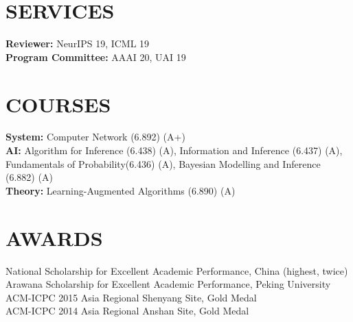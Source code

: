 \documentclass[margin]{res}
\newcommand{\Bullet}[1]{{\raisebox{0.25ex}{\tiny$\bullet$\ }}{#1}\\}
\begin{document}
\begin{resume}

\section{SERVICES}
\textbf{Reviewer:} NeurIPS 19, ICML 19\\
\textbf{Program Committee:} AAAI 20, UAI 19

\section{COURSES}
\textbf{System:} Computer Network (6.892) (A+) \\
\textbf{AI:} Algorithm for Inference (6.438) (A), Information and Inference (6.437) (A), Fundamentals of Probability(6.436) (A), Bayesian Modelling and Inference (6.882) (A) \\
\textbf{Theory:} Learning-Augmented Algorithms (6.890) (A)

\section{AWARDS}
    \Bullet{National Scholarship for Excellent Academic Performance, China (highest, twice)}
    \Bullet{Arawana Scholarship for Excellent Academic Performance, Peking University}
    \Bullet{ACM-ICPC 2015 Asia Regional Shenyang Site, Gold Medal}
    \Bullet{ACM-ICPC 2014 Asia Regional Anshan Site, Gold Medal}


\end{resume}
\end{document}
